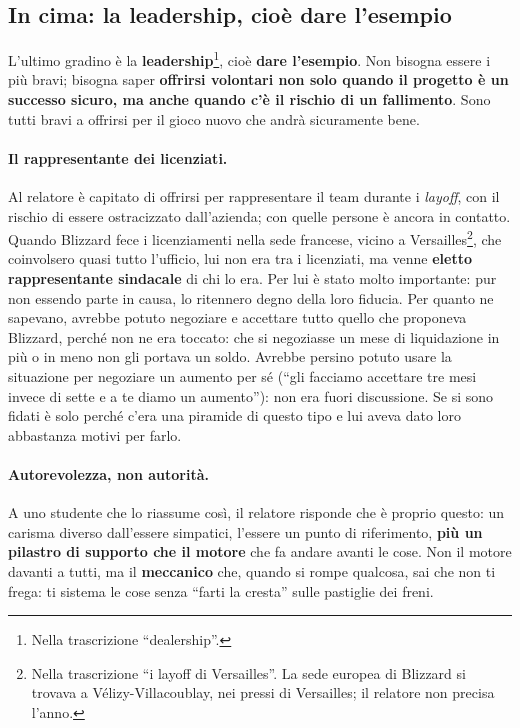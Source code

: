 \subsection{In cima: la leadership, cioè dare l'esempio}

L'ultimo gradino è la \textbf{leadership}\footnote{Nella trascrizione ``dealership''.}, cioè
\textbf{dare l'esempio}. Non bisogna essere i più bravi; bisogna saper \textbf{offrirsi volontari
non solo quando il progetto è un successo sicuro, ma anche quando c'è il rischio di un
fallimento}. Sono tutti bravi a offrirsi per il gioco nuovo che andrà sicuramente bene.

\paragraph{Il rappresentante dei licenziati.} Al relatore è capitato di offrirsi per rappresentare
il team durante i \emph{layoff}, con il rischio di essere ostracizzato dall'azienda; con quelle
persone è ancora in contatto. Quando Blizzard fece i licenziamenti nella sede francese, vicino a
Versailles\footnote{Nella trascrizione ``i layoff di Versailles''. La sede europea di Blizzard si
trovava a Vélizy-Villacoublay, nei pressi di Versailles; il relatore non precisa l'anno.}, che
coinvolsero quasi tutto l'ufficio, lui non era tra i licenziati, ma venne \textbf{eletto
rappresentante sindacale} di chi lo era. Per lui è stato molto importante: pur non essendo parte in
causa, lo ritennero degno della loro fiducia. Per quanto ne sapevano, avrebbe potuto negoziare e
accettare tutto quello che proponeva Blizzard, perché non ne era toccato: che si negoziasse un mese
di liquidazione in più o in meno non gli portava un soldo. Avrebbe persino potuto usare la
situazione per negoziare un aumento per sé (``gli facciamo accettare tre mesi invece di sette e a te
diamo un aumento''): non era fuori discussione. Se si sono fidati è solo perché c'era una piramide di
questo tipo e lui aveva dato loro abbastanza motivi per farlo.

\paragraph{Autorevolezza, non autorità.} A uno studente che lo riassume così, il relatore risponde
che è proprio questo: un carisma diverso dall'essere simpatici, l'essere un punto di riferimento,
\textbf{più un pilastro di supporto che il motore} che fa andare avanti le cose. Non il motore davanti
a tutti, ma il \textbf{meccanico} che, quando si rompe qualcosa, sai che non ti frega: ti sistema le
cose senza ``farti la cresta'' sulle pastiglie dei freni.

